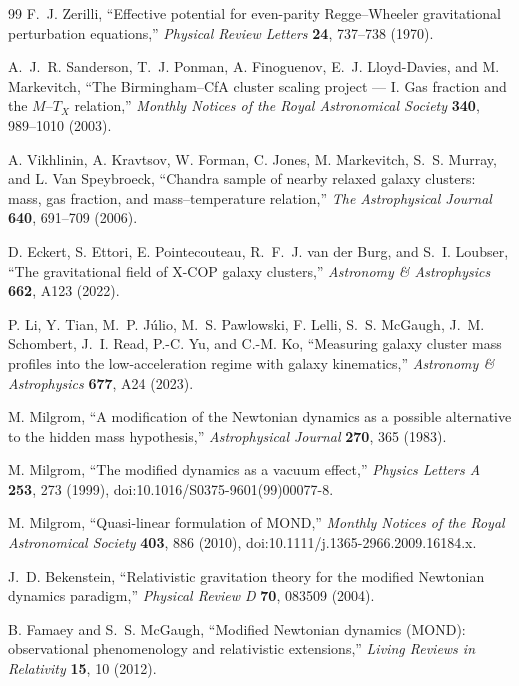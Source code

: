 \documentclass[11pt]{article}
\begin{document}
\begin{thebibliography}{99}
F.~J. Zerilli,
``Effective potential for even-parity Regge--Wheeler gravitational perturbation equations,''
\emph{Physical Review Letters} \textbf{24}, 737--738 (1970).

A.~J.~R. Sanderson, T.~J. Ponman, A. Finoguenov, E.~J. Lloyd-Davies, and M. Markevitch,
``The Birmingham--CfA cluster scaling project --- I. Gas fraction and the $M$--$T_X$ relation,''
\emph{Monthly Notices of the Royal Astronomical Society} \textbf{340}, 989--1010 (2003).

A. Vikhlinin, A. Kravtsov, W. Forman, C. Jones, M. Markevitch, S.~S. Murray, and L. Van Speybroeck,
``Chandra sample of nearby relaxed galaxy clusters: mass, gas fraction, and mass--temperature relation,''
\emph{The Astrophysical Journal} \textbf{640}, 691--709 (2006).

D. Eckert, S. Ettori, E. Pointecouteau, R.~F.~J. van der Burg, and S.~I. Loubser,
``The gravitational field of X-COP galaxy clusters,''
\emph{Astronomy \& Astrophysics} \textbf{662}, A123 (2022).

P. Li, Y. Tian, M.~P. J\'ulio, M.~S. Pawlowski, F. Lelli, S.~S. McGaugh, J.~M. Schombert, J.~I. Read, P.-C. Yu, and C.-M. Ko,
``Measuring galaxy cluster mass profiles into the low-acceleration regime with galaxy kinematics,''
\emph{Astronomy \& Astrophysics} \textbf{677}, A24 (2023).

M. Milgrom,
``A modification of the Newtonian dynamics as a possible alternative to the hidden mass hypothesis,''
\emph{Astrophysical Journal} \textbf{270}, 365 (1983).

M. Milgrom,
``The modified dynamics as a vacuum effect,''
\emph{Physics Letters A} \textbf{253}, 273 (1999),
doi:10.1016/S0375-9601(99)00077-8.

M. Milgrom,
``Quasi-linear formulation of MOND,''
\emph{Monthly Notices of the Royal Astronomical Society} \textbf{403}, 886 (2010),
doi:10.1111/j.1365-2966.2009.16184.x.

J.~D. Bekenstein,
``Relativistic gravitation theory for the modified Newtonian dynamics paradigm,''
\emph{Physical Review D} \textbf{70}, 083509 (2004).

B. Famaey and S.~S. McGaugh,
``Modified Newtonian dynamics (MOND): observational phenomenology and relativistic extensions,''
\emph{Living Reviews in Relativity} \textbf{15}, 10 (2012).


\end{thebibliography}
\end{document}
